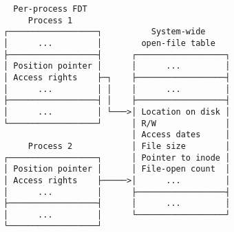 \documentclass[varwidth=40em,crop]{standalone}
\begin{document}
\begin{verbatim}
  Per-process FDT
     Process 1
┌──────────────────┐          System-wide
│      ...         │        open-file table
├──────────────────┤      ┌──────────────────┐
│ Position pointer │      │      ...         │
│ Access rights    ├─┐    ├──────────────────┤
│      ...         │ │    │      ...         │
├──────────────────┤ │    ├──────────────────┤
│      ...         │ └───>│ Location on disk │
└──────────────────┘      │ R/W              │
                          │ Access dates     │
     Process 2            │ File size        │
┌──────────────────┐      │ Pointer to inode │
│ Position pointer │      │ File-open count  │
│ Access rights    ├─────>│      ...         │
│      ...         │      ├──────────────────┤
├──────────────────┤      │      ...         │
│      ...         │      └──────────────────┘
└──────────────────┘
\end{verbatim}
\end{document}
